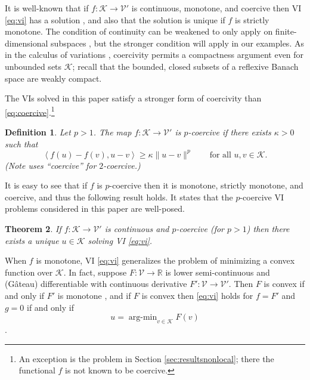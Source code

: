 \documentclass[letterpaper,final,12pt,reqno]{amsart}
\theoremstyle{cstyle}
\newtheorem{theorem}{Theorem}
\theoremstyle{dstyle}
\newtheorem{definition}[theorem]{Definition}
\numberwithin{equation}{section}
\numberwithin{figure}{section}
\numberwithin{table}{section}
\numberwithin{theorem}{section}
\newcommand{\RR}{\mathbb{R}}
\newcommand{\cK}{\mathcal{K}}
\newcommand{\cV}{\mathcal{V}}
\newcommand{\ip}[2]{\left<#1,#2\right>}
\begin{document}
It is well-known that if $f:\cK \to \cV'$ is continuous, monotone, and coercive then VI \eqref{eq:vi} has a solution \cite[Corollary III.1.8]{KinderlehrerStampacchia1980}, and also that the solution is unique if $f$ is strictly monotone.  The condition of continuity can be weakened to only apply on finite-dimensional subspaces \cite{KinderlehrerStampacchia1980}, but the stronger condition will apply in our examples.  As in the calculus of variations \cite{Evans2010}, coercivity permits a compactness argument even for unbounded sets $\cK$; recall that the bounded, closed subsets of a reflexive Banach space are weakly compact.

The VIs solved in this paper satisfy a stronger form of coercivity than \eqref{eq:coercive}.\footnote{An exception is the problem in Section \ref{sec:resultsnonlocal}; there the functional $f$ is not known to be coercive.}

\begin{definition}  Let $p>1$.  The map $f:\cK \to \cV'$ is \emph{$p$-coercive} if there exists $\kappa>0$ such that
\begin{equation}
\ip{f(u)-f(v)}{u-v} \ge \kappa \|u-v\|^p \qquad \text{for all } u,v \in \cK. \label{eq:pcoercive}
\end{equation}
(Note \cite{Tai2003} uses ``coercive'' for $2$-coercive.)
\end{definition}

It is easy to see that if $f$ is $p$-coercive then it is monotone, strictly monotone, and coercive, and thus the following result holds.  It states that the $p$-coercive VI problems considered in this paper are well-posed.

\begin{theorem}  \label{thm:viwellposed}  If $f:\cK \to \cV'$ is continuous and $p$-coercive (for $p>1$) then there exists a unique $u\in \cK$ solving VI \eqref{eq:vi}.
\end{theorem}

When $f$ is monotone, VI \eqref{eq:vi} generalizes the problem of minimizing a convex function over $\cK$.  In fact, suppose $F:\cV \to \RR$ is lower semi-continuous and (G\^ateau) differentiable with continuous derivative $F':\cV \to \cV'$.  Then $F$ is convex if and only if $F'$ is monotone \cite[Proposition I.5.5]{EkelandTemam1976}, and if $F$ is convex then \eqref{eq:vi} holds for $f=F'$ and $g=0$ if and only if
\begin{equation}
u = \operatorname{arg-min}_{v\in\cK} F(v) \label{eq:minimization}
\end{equation}
\cite[Proposition II.2.1]{EkelandTemam1976}.
\end{document}
